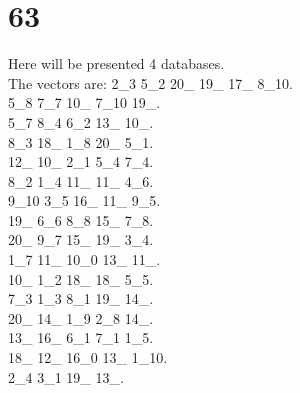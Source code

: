 \chapter{63}
\indent Here will be presented 4 databases.\\
The vectors are:
2\_3 5\_2 20\_ 19\_ 17\_ 8\_10.\\5\_8 7\_7 10\_ 7\_10 19\_.\\5\_7 8\_4 6\_2 13\_ 10\_.\\8\_3 18\_ 1\_8 20\_ 5\_1.\\12\_ 10\_ 2\_1 5\_4 7\_4.\\8\_2 1\_4 11\_ 11\_ 4\_6.\\9\_10 3\_5 16\_ 11\_ 9\_5.\\19\_ 6\_6 8\_8 15\_ 7\_8.\\20\_ 9\_7 15\_ 19\_ 3\_4.\\1\_7 11\_ 10\_0 13\_ 11\_.\\10\_ 1\_2 18\_ 18\_ 5\_5.\\7\_3 1\_3 8\_1 19\_ 14\_.\\20\_ 14\_ 1\_9 2\_8 14\_.\\13\_ 16\_ 6\_1 7\_1 1\_5.\\18\_ 12\_ 16\_0 13\_ 1\_10.\\2\_4 3\_1 19\_ 13\_.\\